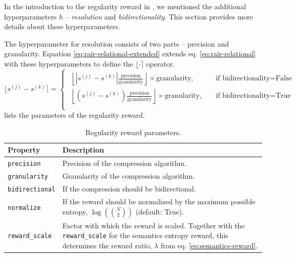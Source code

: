 In the introduction to the regularity reward in , we mentioned the additional hyperparameters \(h\) -- \emph{resolution} and \emph{bidirectionality}.
This section provides more details about these hyperparameters.

The hyperparameter for resolution consists of two parts -- precision and granularity.
Equation \eqref{eq:rair-relational-extended} extends eq. \eqref{eq:rair-relational} with these hyperparameters to define the \(\lfloor \cdot \rceil\) operator.
\begin{equation}
    \lfloor s^{(j)} - s^{(k)} \rceil = \begin{cases}\begin{aligned}
        \left\lfloor \left| s^{(j)} - s^{(k)} \right| \frac{\text{precision}}{\text{granularity}} \right\rfloor \times \text{granularity},\quad&\text{if bidirectionality} = \text{False}\\
        \left\lfloor \left( s^{(j)} - s^{(k)} \right) \frac{\text{precision}}{\text{granularity}} \right\rfloor \times \text{granularity},\quad&\text{if bidirectionality} = \text{True}\\
    \end{aligned}\end{cases}
    \label{eq:rair-relational-extended}
\end{equation}
 lists the parameters of the regularity reward.
\begin{table}[H]
    \centering
    \begin{tabularx}{\textwidth}{C{3.9cm} L}
        \hline
        Property & Description\\
        \hline
        \texttt{precision} & Precision of the compression algorithm.\\
        \texttt{granularity} & Granularity of the compression algorithm.\\
        \texttt{bidirectional} & If the compression should be bidirectional.\\
        \texttt{normalize} & If the reward should be normalized by the maximum possible entropy, \(\log\left(\binom{N}{2}\right)\) (default: True).\\
        \texttt{reward\_scale} & Factor with which the reward is scaled. Together with the \texttt{reward\_scale} for the semantics entropy reward, this determines the reward ratio, \(\lambda\) from eq. \eqref{eq:semantics-reward}.\\
        \hline
    \end{tabularx}
    \caption{Regularity reward parameters.}
    \label{tab:regularity-reward-params}
\end{table}

